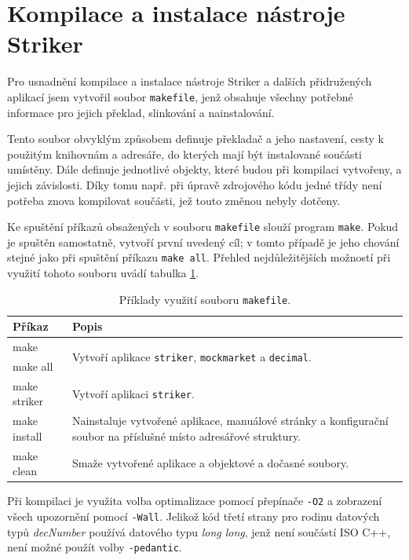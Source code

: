 \documentclass[thesis=M,czech]{FITthesis}[2012/06/26]
\begin{document}

\section{Kompilace a instalace nástroje Striker}

Pro usnadnění kompilace a instalace nástroje Striker a dalších přidružených aplikací jsem vytvořil soubor \texttt{makefile}, jenž
obsahuje všechny potřebné informace pro jejich překlad, slinkování a nainstalování. 

Tento soubor obvyklým způsobem definuje překladač a jeho nastavení, cesty k použitým knihovnám a adresáře, do kterých mají 
být instalované součásti umístěny. Dále definuje jednotlivé objekty, které budou při kompilaci vytvořeny, a jejich závislosti. Díky 
tomu např. při úpravě zdrojového kódu jedné třídy není potřeba znova kompilovat součásti, jež touto změnou nebyly dotčeny.

Ke spuštění příkazů obsažených v souboru \texttt{makefile} slouží program \texttt{make}. Pokud je spuštěn samostatně, vytvoří 
první uvedený cíl; v tomto případě je jeho chování stejné jako při spuštění příkazu \texttt{make all}. Přehled nejdůležitějších 
možností při využití tohoto souboru uvádí tabulka \ref{tab:makefile}. 

\begin{table}\centering
	\begin{tabular}{| l | p{10cm} |}\hline
		Příkaz		& Popis	\tabularnewline \hline \hline
		make		& \multirow{2}{*}{Vytvoří aplikace \texttt{striker}, \texttt{mockmarket} a \texttt{decimal}.} 	\tabularnewline 
		make all	& 										\tabularnewline \hline
		make striker 	& Vytvoří aplikaci \texttt{striker}.	\tabularnewline \hline
		make install	& Nainstaluje vytvořené aplikace, manuálové stránky a konfigurační soubor
					na příslušné místo adresářové struktury.	\tabularnewline \hline
   		make clean 	& Smaže vytvořené aplikace a objektové a dočasné soubory.	\tabularnewline \hline
	\end{tabular}
	\caption[Příklady využití souboru \texttt{makefile}]{Příklady využití souboru \texttt{makefile}.}
	\label{tab:makefile}
\end{table}

Při kompilaci je využita volba optimalizace pomocí přepínače \texttt{-O2} a zobrazení všech upozornění pomocí 
\texttt{-Wall}. Jelikož kód třetí strany pro rodinu datových typů \textit{decNumber} používá datového typu \textit{long long}, 
jenž není součástí ISO C++, není možné použít volby \texttt{-pedantic}.
\end{document}
